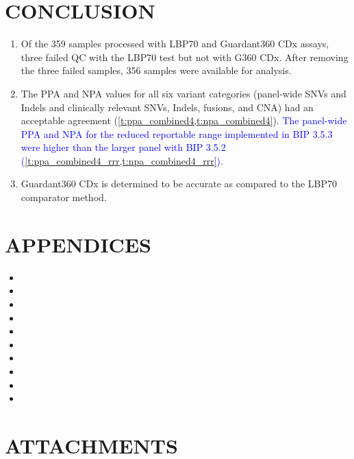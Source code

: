 \documentclass[12pt]{protocol}
\begin{document}
\section{CONCLUSION}

\begin{enumerate}
    \item Of the 359 samples processed with LBP70 and Guardant360 CDx assays, three failed QC with
        the LBP70 test but not with G360 CDx. After removing the three failed samples, 356 samples
        were available for analysis.
    \item The PPA and NPA values for all six variant categories (panel-wide SNVs and Indels and
        clinically relevant SNVs, Indels, fusions, and CNA) had an acceptable agreement
        (\cref{t:ppa_combined4,t:npa_combined4}).
       	\textcolor{blue}{The panel-wide PPA and NPA for the reduced reportable range 
       	implemented in BIP 3.5.3 were higher than the larger panel with BIP 3.5.2
       	(\cref{t:ppa_combined4_rrr,t:npa_combined4_rrr}).}
    \item Guardant360 CDx is determined to be accurate as compared to the LBP70 comparator method.
\end{enumerate}

\section{APPENDICES}

\begin{itemize}
    \item {}
    \item {}
    \item {}
    \item {}
    \item {}
    \item {}
    \item {}
    \item {}
    \item {}
    \item {}
\end{itemize}

\section{ATTACHMENTS}
\end{document}
